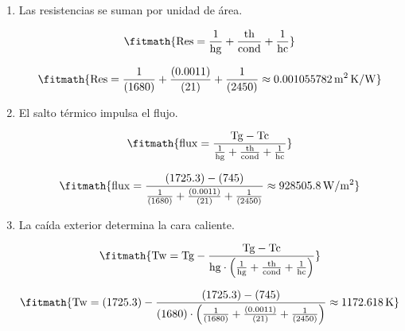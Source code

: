 \begin{enumerate}

\item Las resistencias se suman por unidad de área.

\[\fitmath{\mathrm{Res}=\frac{1}{\mathrm{hg}}+\frac{\mathrm{th}}{\mathrm{cond}}+\frac{1}{\mathrm{hc}}}\]

\[\fitmath{\mathrm{Res}=\frac{1}{(1680)}+\frac{(0.0011)}{(21)}+\frac{1}{(2450)}\approx 0.001055782\,\mathrm{m^{2}\,K/W}}\]

\item El salto térmico impulsa el flujo.

\[\fitmath{\mathrm{flux}=\frac{\mathrm{Tg}-\mathrm{Tc}}{\frac{1}{\mathrm{hg}}+\frac{\mathrm{th}}{\mathrm{cond}}+\frac{1}{\mathrm{hc}}}}\]

\[\fitmath{\mathrm{flux}=\frac{(1725.3)-(745)}{\frac{1}{(1680)}+\frac{(0.0011)}{(21)}+\frac{1}{(2450)}}\approx 928505.8\,\mathrm{W/m^{2}}}\]

\item La caída exterior determina la cara caliente.

\[\fitmath{\mathrm{Tw}=\mathrm{Tg}-\frac{\mathrm{Tg}-\mathrm{Tc}}{\mathrm{hg}\cdot \left(\frac{1}{\mathrm{hg}}+\frac{\mathrm{th}}{\mathrm{cond}}+\frac{1}{\mathrm{hc}}\right)}}\]

\[\fitmath{\mathrm{Tw}=(1725.3)-\frac{(1725.3)-(745)}{(1680)\cdot \left(\frac{1}{(1680)}+\frac{(0.0011)}{(21)}+\frac{1}{(2450)}\right)}\approx 1172.618\,\mathrm{K}}\]

\end{enumerate}
